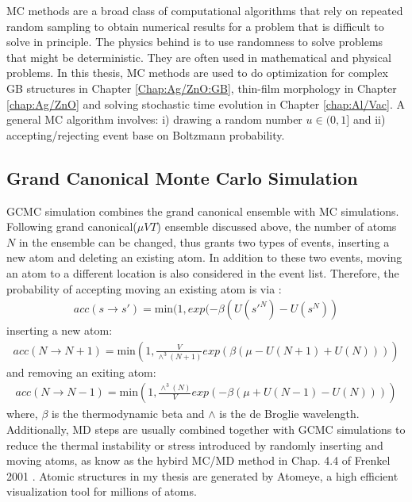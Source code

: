 \ac{MC} methods are a broad class of computational algorithms that rely on repeated random sampling to obtain numerical results for a problem that is difficult to solve in principle. The physics behind is to use randomness to solve problems that might be deterministic. They are often used in mathematical \cite{hubbard2009modeling} and physical \cite{bortz1975new} problems. In this thesis, \ac{MC} methods are used to do optimization for complex \ac{GB} structures in Chapter \ref{Chap:Ag/ZnO:GB}, thin-film morphology in Chapter \ref{chap:Ag/ZnO} and solving stochastic time evolution in Chapter \ref{chap:Al/Vac}. A general \ac{MC} algorithm involves: i) drawing a random number $u \in (0,1]$ and ii) accepting/rejecting event base on Boltzmann probability.

\subsection{Grand Canonical Monte Carlo Simulation}
\label{Chap:Mech:GCMC:GCMC}

\ac{GCMC} simulation combines the grand canonical ensemble with \ac{MC} simulations. Following grand canonical($\mu VT$) ensemble discussed above, the number of atoms $N$ in the ensemble can be changed, thus grants two types of events, inserting a new atom and deleting an existing atom. In addition to these two events, moving an atom to a different location is also considered in the event list. Therefore, the probability of accepting moving an existing atom is via \cite{frenkel2001understanding}:
\begin{align}
acc(s \rightarrow s') = \text{min}(1, exp(-\beta(U(s'^N) - U(s^N))
\label{Chap:Meth:eq:acc:move}
\end{align}
inserting a new atom:
\begin{align}
acc(N \rightarrow N+1) = \text{min}(1, \frac{V}{\wedge^3(N+1)}exp(\beta(\mu - U(N + 1) + U(N)))) \label{Chap:Meth:eq:acc:insert}
\end{align}
and removing an exiting atom:
\begin{align}
acc(N \rightarrow N-1) = \text{min}(1, \frac{\wedge^3(N)}{V}exp(-\beta(\mu + U(N - 1) - U(N)))) \label{Chap:Meth:eq:acc:remove}
\end{align}
where, $\beta$ is the thermodynamic beta and $\wedge$ is the de Broglie wavelength. Additionally, \ac{MD} steps are usually combined together with \ac{GCMC} simulations to reduce the thermal instability or stress introduced by randomly inserting and moving atoms, as know as the hybird \ac{MC}/\ac{MD} method in Chap. 4.4 of Frenkel 2001 \cite{frenkel2001understanding}. Atomic structures in my thesis are generated by Atomeye, a high efficient visualization tool for millions of atoms. \cite{li2003atomeye}